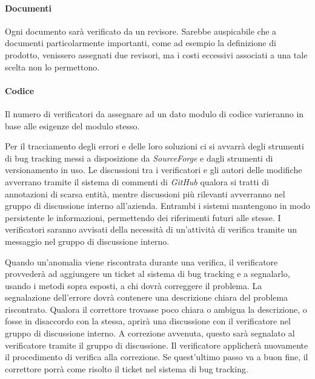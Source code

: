 \paragraph{Documenti} Ogni documento sar\`a verificato da un revisore. Sarebbe auspicabile che a documenti particolarmente importanti, come ad esempio la definizione di prodotto, venissero assegnati due revisori, ma i costi eccessivi associati a una tale scelta non lo permettono.
\paragraph{Codice} Il numero di verificatori da assegnare ad un dato modulo di codice varieranno in base alle esigenze del modulo stesso.

Per il tracciamento degli errori e delle loro soluzioni ci si avvarr\`a degli strumenti di bug tracking messi a disposizione da \textit{SourceForge} e dagli strumenti di versionamento in uso.
Le discussioni tra i verificatori e gli autori delle modifiche avverrano tramite il sistema di commenti di \textit{GitHub} qualora si tratti di annotazioni di scarsa entit\`a, mentre discussioni pi\`u rilevanti avverranno nel gruppo di discussione interno all'azienda. Entrambi i sistemi mantengono in modo persistente le informazioni, permettendo dei riferimenti futuri alle stesse. I verificatori saranno avvisati della necessit\`a di un'attivit\`a di verifica tramite un messaggio nel gruppo di discussione interno. 



Quando un'anomalia viene riscontrata durante una verifica, il verificatore provveder\`a ad aggiungere un ticket al sistema di bug tracking e a segnalarlo, usando i metodi sopra esposti, a chi dovr\`a correggere il problema. La segnalazione dell'errore dovr\`a contenere una descrizione chiara del problema riscontrato. Qualora il correttore trovasse poco chiara o ambigua la descrizione, o fosse in disaccordo con la stessa, aprir\`a una discussione con il verificatore nel gruppo di discussione interno. A correzione avvenuta, questo sar\`a segnalato al verificatore tramite il gruppo di discussione. Il verificatore applicher\`a nuovamente il procedimento di verifica alla correzione. Se quest'ultimo passo va a buon fine, il correttore porr\`a come risolto il ticket nel sistema di bug tracking.

